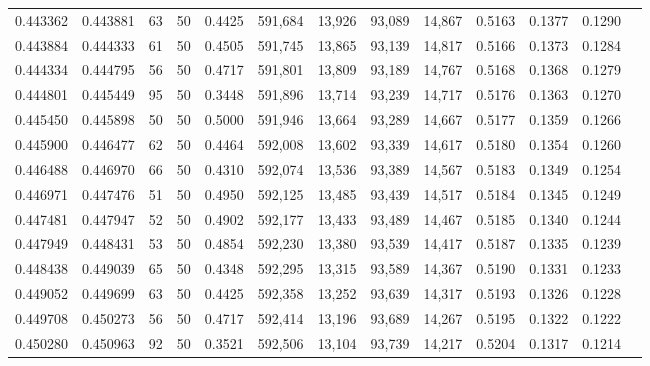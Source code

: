 \begin{tabular}{rrrrrrrrrrrrr}
0.443362 & 0.443881 &    63 &  50 &                                     0.4425 & 591,684 &  13,926 &  93,089 &  14,867 & 0.5163 & 0.1377 & 0.1290 \\
0.443884 & 0.444333 &    61 &  50 &                                     0.4505 & 591,745 &  13,865 &  93,139 &  14,817 & 0.5166 & 0.1373 & 0.1284 \\
0.444334 & 0.444795 &    56 &  50 &                                     0.4717 & 591,801 &  13,809 &  93,189 &  14,767 & 0.5168 & 0.1368 & 0.1279 \\
0.444801 & 0.445449 &    95 &  50 &                                     0.3448 & 591,896 &  13,714 &  93,239 &  14,717 & 0.5176 & 0.1363 & 0.1270 \\
0.445450 & 0.445898 &    50 &  50 &                                     0.5000 & 591,946 &  13,664 &  93,289 &  14,667 & 0.5177 & 0.1359 & 0.1266 \\
0.445900 & 0.446477 &    62 &  50 &                                     0.4464 & 592,008 &  13,602 &  93,339 &  14,617 & 0.5180 & 0.1354 & 0.1260 \\
0.446488 & 0.446970 &    66 &  50 &                                     0.4310 & 592,074 &  13,536 &  93,389 &  14,567 & 0.5183 & 0.1349 & 0.1254 \\
0.446971 & 0.447476 &    51 &  50 &                                     0.4950 & 592,125 &  13,485 &  93,439 &  14,517 & 0.5184 & 0.1345 & 0.1249 \\
0.447481 & 0.447947 &    52 &  50 &                                     0.4902 & 592,177 &  13,433 &  93,489 &  14,467 & 0.5185 & 0.1340 & 0.1244 \\
0.447949 & 0.448431 &    53 &  50 &                                     0.4854 & 592,230 &  13,380 &  93,539 &  14,417 & 0.5187 & 0.1335 & 0.1239 \\
0.448438 & 0.449039 &    65 &  50 &                                     0.4348 & 592,295 &  13,315 &  93,589 &  14,367 & 0.5190 & 0.1331 & 0.1233 \\
0.449052 & 0.449699 &    63 &  50 &                                     0.4425 & 592,358 &  13,252 &  93,639 &  14,317 & 0.5193 & 0.1326 & 0.1228 \\
0.449708 & 0.450273 &    56 &  50 &                                     0.4717 & 592,414 &  13,196 &  93,689 &  14,267 & 0.5195 & 0.1322 & 0.1222 \\
0.450280 & 0.450963 &    92 &  50 &                                     0.3521 & 592,506 &  13,104 &  93,739 &  14,217 & 0.5204 & 0.1317 & 0.1214 \\

\end{tabular}
